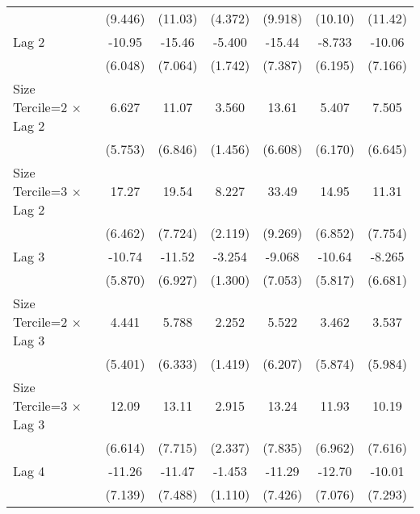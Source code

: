 \begin{table}[htbp]
\begin{tabular}{l*{6}{c}}
                &  (9.446)         &  (11.03)         &  (4.372)         &  (9.918)         &  (10.10)         &  (11.42)         \\
\addlinespace
Lag 2           &   -10.95         &   -15.46\sym{*}  &   -5.400\sym{**} &   -15.44\sym{*}  &   -8.733         &   -10.06         \\
                &  (6.048)         &  (7.064)         &  (1.742)         &  (7.387)         &  (6.195)         &  (7.166)         \\
\addlinespace
Size Tercile=2 $\times$ Lag 2&    6.627         &    11.07         &    3.560\sym{*}  &    13.61\sym{*}  &    5.407         &    7.505         \\
                &  (5.753)         &  (6.846)         &  (1.456)         &  (6.608)         &  (6.170)         &  (6.645)         \\
\addlinespace
Size Tercile=3 $\times$ Lag 2&    17.27\sym{**} &    19.54\sym{*}  &    8.227\sym{***}&    33.49\sym{***}&    14.95\sym{*}  &    11.31         \\
                &  (6.462)         &  (7.724)         &  (2.119)         &  (9.269)         &  (6.852)         &  (7.754)         \\
\addlinespace
Lag 3           &   -10.74         &   -11.52         &   -3.254\sym{*}  &   -9.068         &   -10.64         &   -8.265         \\
                &  (5.870)         &  (6.927)         &  (1.300)         &  (7.053)         &  (5.817)         &  (6.681)         \\
\addlinespace
Size Tercile=2 $\times$ Lag 3&    4.441         &    5.788         &    2.252         &    5.522         &    3.462         &    3.537         \\
                &  (5.401)         &  (6.333)         &  (1.419)         &  (6.207)         &  (5.874)         &  (5.984)         \\
\addlinespace
Size Tercile=3 $\times$ Lag 3&    12.09         &    13.11         &    2.915         &    13.24         &    11.93         &    10.19         \\
                &  (6.614)         &  (7.715)         &  (2.337)         &  (7.835)         &  (6.962)         &  (7.616)         \\
\addlinespace
Lag 4           &   -11.26         &   -11.47         &   -1.453         &   -11.29         &   -12.70         &   -10.01         \\
                &  (7.139)         &  (7.488)         &  (1.110)         &  (7.426)         &  (7.076)         &  (7.293)         \\

\end{tabular}
\end{table}
